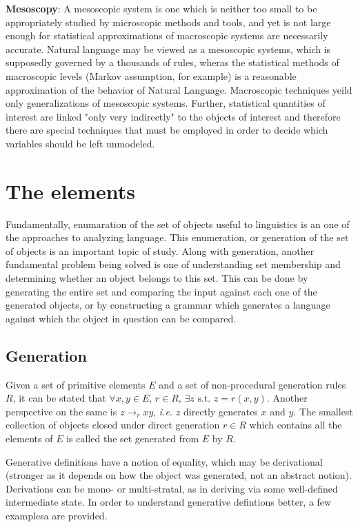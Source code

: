 \documentclass{report}
\begin{document}
\textbf{Mesoscopy}: A mesoscopic system is one which is neither too small to be
appropriately studied by microscopic methods and tools, and yet is not large
enough for statistical approximations of macroscopic systems are necessarily
accurate. Natural language may be viewed as a mesoscopic systems, which is
supposedly governed by a thousands of rules, wheras the statistical methods of
macroscopic levels (Markov assumption, for example) is a reasonable
approximation of the behavior of Natural Language. Macroscopic techniques yeild
only generalizations of mesoscopic systems. Further, statistical quantities
of interest are linked "only very indirectly" to the objects of interest and
therefore there are special techniques that must be employed in order to decide
which variables should be left unmodeled.

\chapter{The elements}

Fundamentally, enumaration of the set of objects useful to linguistics is an
one of the approaches to analyzing language. This enumeration, or generation
of the set of objects is an important topic of study. Along with generation,
another fundamental problem being solved is one of understanding set membership
and determining whether an object belongs to this set. This can be done by
generating the entire set and comparing the input against each one of the
generated objects, or by constructing a grammar which generates a language
against which the object in question can be compared.

\section{Generation}

Given a set of primitive elements $E$ and a set of non-procedural generation
rules $R$, it can be stated that $\forall x, y \in E,\, r \in R,\, \exists z
\text{ s.t. } z = r(x,y)$. Another perspective on the same is $z \rightarrow_r
xy$, \textit{i.e.} $z$ directly generates $x$ and $y$. The smallest collection
of objects closed under direct generation $r \in R$ which contains all the
elements of $E$ is called the set generated from $E$ by $R$.

Generative definitions have a notion of equality, which may be derivational
(stronger as it depends on how the object was generated, not an abstract
notion). Derivations can be mono- or multi-stratal, as in deriving via some
well-defined intermediate state. In order to understand generative defintions
better, a few examplesa are provided.
\end{document}
